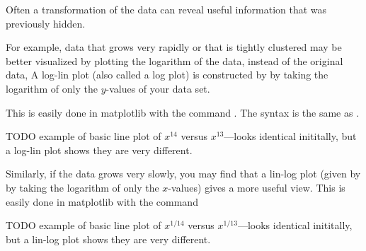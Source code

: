 Often a transformation of the data can reveal useful information that was previously hidden.

For example, data that grows very rapidly or that is tightly clustered may be better visualized by plotting the logarithm of the data, instead of the original data, A log-lin plot (also called a log plot) is constructed by by taking the logarithm of only the $y$-values of your data set. 

This is easily done in matplotlib with the command .  The syntax is the same as .

TODO example of basic line plot of $x^{14}$ versus $x^{13}$---looks identical inititally, but a log-lin plot shows they are very different.



Similarly, if the data grows very slowly, you may find that a lin-log plot (given by by taking the logarithm of only the $x$-values) gives a more useful view.
This is easily done in matplotlib with the command 


TODO example of basic line plot of $x^{1/14}$ versus $x^{1/13}$---looks identical inititally, but a lin-log plot shows they are very different.


